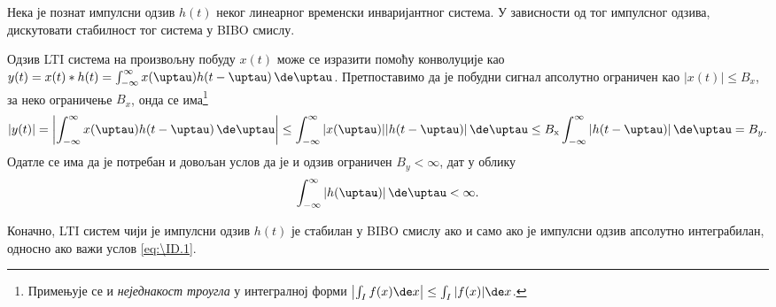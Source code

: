 \PID \label{z:bibo_imp}
Нека је познат импулсни одзив $h(t)$ неког линеарног временски инваријантног система.
У зависности од тог импулсног одзива, дискутовати стабилност тог система у BIBO смислу.
\vspace*{2mm}

\RESENJE  Одзив LTI система на произвољну побуду $x(t)$ може се изразити 
помоћу конволуције као 
$y(t) = x(t) \ast h(t) = \int_{-\infty}^{\infty} x(\uptau) h(t - \uptau )\, \de \uptau$. Претпоставимо да је 
побудни сигнал апсолутно ограничен као $|x(t)| \leq B_{x}$, за неко ограничење $B_x$, онда се 
има\footnote{Примењује се и \textit{неједнакост троугла} у интегралној форми 
$\left\lvert \int_I f(x) \de x \right\rvert \leq \int_I |f(x)| \de x$.
} 
\begin{equation}
    |y(t)| = 
    \left\lvert
    \int_{-\infty}^{\infty} x(\uptau) h(t - \uptau )\, \de \uptau 
    \right\rvert \leq
    \int_{-\infty}^{\infty} |x(\uptau)| |h(t - \uptau )|\, \de \uptau \leq 
    B_{\rm x} \int_{-\infty}^{\infty} |h(t - \uptau )|\, \de \uptau = B_{y}.
\end{equation}
Одатле се има да је потребан и довољан услов да је и одзив ограничен $B_y < \infty$, дат у облику
\begin{equation}
\int_{-\infty}^{\infty} |h(\uptau )|\, \de \uptau < \infty. \label{eq:\ID.1}
\end{equation}

Коначно, LTI систем  чији је импулсни одзив $h(t)$ је стабилан у BIBO смислу ако и само ако је
импулсни одзив апсолутно интеграбилан, односно ако важи услов \eqref{eq:\ID.1}.

